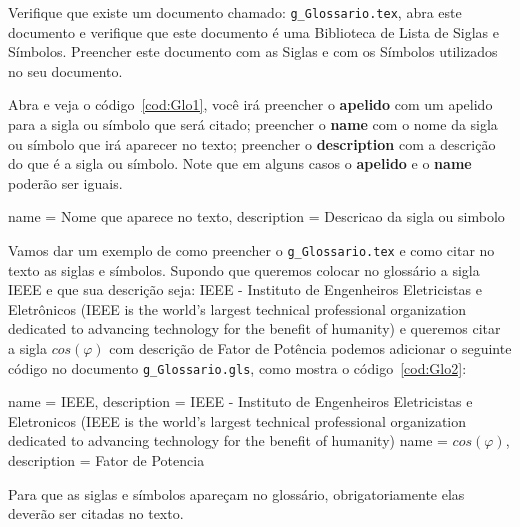 Verifique que existe um documento chamado: \verb|g_Glossario.tex|, abra este documento e verifique que este documento é uma Biblioteca de Lista de Siglas e Símbolos. Preencher este documento com as Siglas e com os Símbolos utilizados no seu documento.

Abra e veja o código~\ref{cod:Glo1}, você irá preencher o {\bf apelido} com um apelido para a sigla ou símbolo que será citado; preencher o {\bf name} com o nome da sigla ou símbolo que irá aparecer no texto; preencher o {\bf description} com a descrição do que é a sigla ou símbolo. Note que em alguns casos o {\bf apelido} e o {\bf name} poderão ser iguais.

\pagebreak

\begin{Codigo}[language=tex, caption=Biblioteca de Glossários~ {\bf g\_Glossario.gls}, label=cod:Glo1]
    {
    name = {Nome que aparece no texto},
    description = {Descricao da sigla ou simbolo}
    }
\end{Codigo}

Vamos dar um exemplo de como preencher o \verb|g_Glossario.tex| e como citar no texto as siglas e símbolos. Supondo que queremos colocar no glossário a sigla IEEE e que sua descrição seja: IEEE - Instituto de Engenheiros Eletricistas e Eletrônicos (IEEE is the world's largest technical professional organization dedicated to advancing technology for the benefit of humanity) e queremos citar a sigla $cos(\varphi)$ com descrição de {Fator de Potência} podemos adicionar o seguinte código no documento \verb|g_Glossario.gls|, como mostra o código~\ref{cod:Glo2}:

\begin{Codigo}[language=tex, caption=Biblioteca de Glossários~ {\bf g\_Glossario.gls}, label=cod:Glo2]
    {
    name = {IEEE},
    description = {IEEE - Instituto de Engenheiros
    Eletricistas e Eletronicos (IEEE is the world's 
    largest technical professional organization 
    dedicated to advancing technology for the benefit 
    of humanity)}
    }
    {
    name = {$cos(\varphi)$},
    description = {Fator de Potencia}
    }
\end{Codigo}

\begin{CaixaVermelha}
    Para que as siglas e símbolos apareçam no glossário, obrigatoriamente elas deverão ser citadas no texto.
\end{CaixaVermelha}

